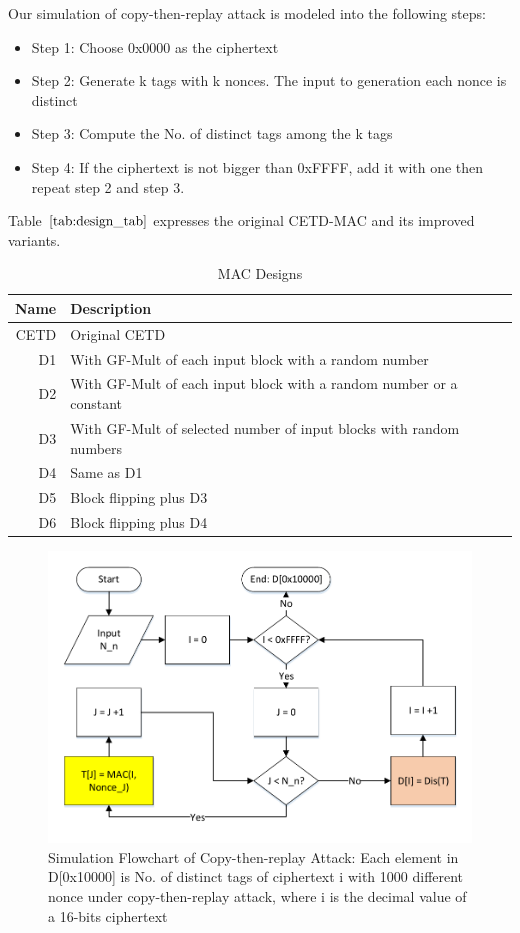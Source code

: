 \documentclass{article}
\begin{document}
Our simulation of copy-then-replay attack is modeled into the following steps:
\begin{itemize}
	\item Step 1: Choose 0x0000 as the ciphertext 
	\item Step 2: Generate k tags with k nonces. The input to generation each nonce is distinct
	\item Step 3: Compute the No. of distinct tags among the k tags
	\item Step 4: If the ciphertext is not bigger than 0xFFFF, add it with one then repeat step 2 and step 3.
\end{itemize}
Table $\ref{tab:design_tab}$ expresses the original CETD-MAC and its improved variants. 
\begin{table}[htbp]  
  \centering
  \caption{MAC Designs}
    \begin{tabular}{r|l}
    \toprule
    Name  & Description \\
    \midrule
    CETD  & Original CETD \\
    D1    & With GF-Mult of each input block with a random number \\
    D2    & With GF-Mult of each input block with a random number or a constant \\
    D3    & With GF-Mult of selected number of input blocks with random numbers \\
    D4    & Same as D1 \\
    D5    & Block flipping plus D3 \\
    D6    & Block flipping plus D4 \\
    \bottomrule
    \end{tabular}%
    \label{tab:design_tab}%
\end{table}%
\begin{figure}[htbp]
 \centering
 \includegraphics[scale=0.4]{./diagrams/replay_attack.pdf}
 \caption{Simulation Flowchart of Copy-then-replay Attack: Each element in D[0x10000] is No. of distinct tags of ciphertext i with 1000 different nonce under copy-then-replay attack, where i is the decimal value of a 16-bits ciphertext}
 \label{fig:ctra}
\end{figure}
\end{document}
